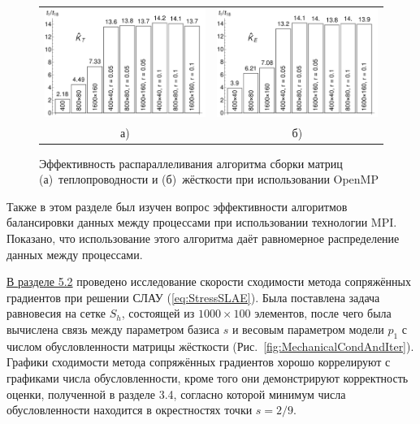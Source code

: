 \begin{figure}[ht] \centering
	\begin{tabular}{cc}
		\includegraphics[width=0.38\linewidth]{pics/OMPThermal.pdf} &
		\includegraphics[width=0.38\linewidth]{pics/OMPMechanical.pdf} \\
		а) & б)
	\end{tabular}
    \caption{Эффективность распараллеливания алгоритма сборки матриц (а)~теплопроводности и (б)~жёсткости при использовании OpenMP}
    \label{fig:OMPParallelization}
\end{figure}

Также в этом разделе был изучен вопрос эффективности алгоритмов балансировки данных между процессами при использовании технологии MPI. Показано, что использование этого алгоритма даёт равномерное распределение данных между процессами.

\underline{В разделе 5.2} проведено исследование скорости сходимости метода сопряжённых градиентов при решении СЛАУ (\ref{eq:StressSLAE}). Была поставлена задача равновесия на сетке $S_h$, состоящей из $1000 \times 100$ элементов, после чего была вычислена связь между параметром базиса $s$ и весовым параметром модели $p_1$ с числом обусловленности матрицы жёсткости (Рис.~\ref{fig:MechanicalCondAndIter}). Графики сходимости метода сопряжённых градиентов хорошо коррелируют с графиками числа обусловленности, кроме того они демонстрируют корректность оценки, полученной в разделе 3.4, согласно которой минимум числа обусловленности находится в окрестностях точки $s = 2/9$.


